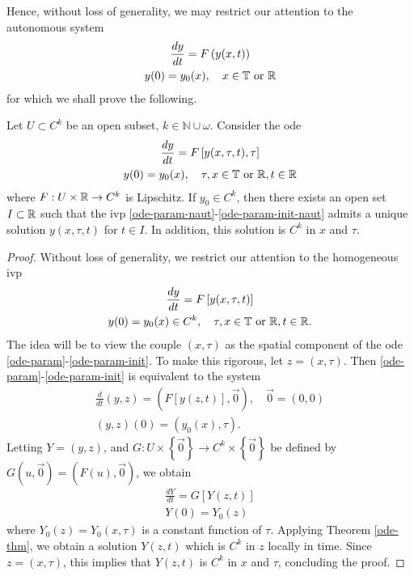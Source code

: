 %
%
Hence, without loss of generality, we may restrict our attention to the
autonomous system
%
%
\begin{gather}
\frac{dy}{dt} = F\left( y(x,t) \right)
\label{ode-eq}
\\
y(0) = y_{0}(x), \quad x \in \mathbb{T} \ \text{or} \ \mathbb{R}
\label{ode-init-data}
\end{gather}
%
%
%
for which we shall prove the following.
%
%
%
%
%
%
%
%
%
\begin{corollary}
  \label{cor:reg-param}
  Let $U \subset C^{k}$ be an open subset, $ k \in \mathbb{N} \cup \omega$.  
Consider the ode
\begin{gather}
  \label{ode-param-naut}
\frac{dy}{dt} = F \left [ y(x, \tau, t), \tau \right]
\\
y(0) = y_{0}(x), \quad \tau, x \in \mathbb{T} \ \text{or} \ \mathbb{R}, t \in \mathbb{R}
\label{ode-param-init-naut}
\end{gather}
%
%
where $F: U \times \mathbb{R}  \to C^{k}$ is Lipschitz. If $y_{0} \in C^{k}$, then
there exists an 
open set $I \subset \mathbb{R}$
such that the ivp \eqref{ode-param-naut}-\eqref{ode-param-init-naut}
admits a unique solution $y(x, \tau, t)$ for $t \in I$. In addition,
this solution is $C^{k}$ in $x$ and $\tau$.
%
\end{corollary}
%
\begin{proof}
  Without loss of generality, we restrict our attention to the homogeneous ivp
\begin{gather}
  \label{ode-param}
\frac{dy}{dt} = F \left [ y(x, \tau, t) \right]
\\
y(0) = y_{0}(x) \in C^{k}, \quad \tau, x \in \mathbb{T} \ \text{or} \
\mathbb{R}, t \in \mathbb{R}.
\label{ode-param-init}
\end{gather}
  The idea will be to view the couple
  $(x, \tau)$ as the spatial component of the ode
  \eqref{ode-param}-\eqref{ode-param-init}.
  To make this rigorous, let $z = (x, \tau)$. Then
  \eqref{ode-param}-\eqref{ode-param-init} is equivalent to the system
  \begin{gather*}
    \frac{d}{dt}(y, z) = \left( F[y(z,t)], \vec{0} \right), \quad \vec 0 =
    (0, 0)
  \\
  (y, z)(0) = \left ( y_{0}(x), \tau \right ).
  \end{gather*}
  Letting $Y = (y,z)$, and $G: U \times \left\{ \vec{0} \right\} 
  \to C^{k} \times \left\{ \vec{0} \right\}$ be defined
  by $G(u, \vec{0}) = \left( F(u), \vec{0} \right)$, we obtain
  \begin{gather*}
      \frac{dY}{dt} = G\left[ Y(z,t) \right]
      \\
      Y(0) = Y_{0}(z)
  \end{gather*}
%
where $Y_{0}(z) = Y_{0}(x, \tau)$ is a constant function of $\tau$. 
Applying Theorem \ref{ode-thm},  we obtain a solution $Y(z,t)$ which is
$C^{k}$ in $z$ locally in time. Since $z = (x, \tau)$, this implies that $Y(z,t)$ is
$C^{k}$ in $x$ and $\tau$, concluding the proof. 
%
\end{proof}
